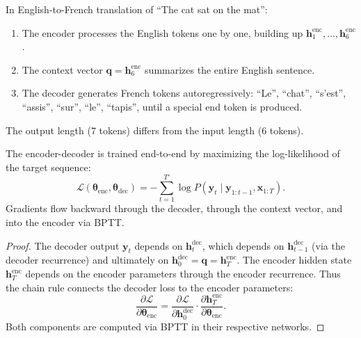 \documentclass[11pt,a4paper]{article}
\begin{document}
\begin{example}
\label{ex:translation}
In English-to-French translation of ``The cat sat on the mat'':
\begin{enumerate}[nosep]
  \item The encoder processes the English tokens one by one,
    building up $\mathbf{h}_1^{\text{enc}}, \ldots,
    \mathbf{h}_6^{\text{enc}}$.
  \item The context vector $\mathbf{q} = \mathbf{h}_6^{\text{enc}}$
    summarizes the entire English sentence.
  \item The decoder generates French tokens autoregressively:
    ``Le'', ``chat'', ``s'est'', ``assis'', ``sur'', ``le'',
    ``tapis'', until a special end token is produced.
\end{enumerate}
The output length (7 tokens) differs from the input length
(6 tokens).
\end{example}

\begin{proposition}
\label{prop:enc-dec-training}
The encoder-decoder is trained end-to-end by maximizing the
log-likelihood of the target sequence:
\begin{equation}
  \mathcal{L}(\boldsymbol{\theta}_{\text{enc}},
    \boldsymbol{\theta}_{\text{dec}})
    = -\sum_{t=1}^{T'} \log P(\mathbf{y}_t \mid
      \mathbf{y}_{1:t-1}, \mathbf{x}_{1:T}).
  \label{eq:enc-dec-loss}
\end{equation}
Gradients flow backward through the decoder, through the context
vector, and into the encoder via BPTT.
\end{proposition}

\begin{proof}
The decoder output $\mathbf{y}_t$ depends on
$\mathbf{h}_t^{\text{dec}}$, which depends on
$\mathbf{h}_{t-1}^{\text{dec}}$ (via the decoder recurrence) and
ultimately on $\mathbf{h}_0^{\text{dec}} = \mathbf{q} =
\mathbf{h}_T^{\text{enc}}$.  The encoder hidden state
$\mathbf{h}_T^{\text{enc}}$ depends on the encoder parameters
through the encoder recurrence.  Thus the chain rule connects the
decoder loss to the encoder parameters:
\[
  \frac{\partial \mathcal{L}}{\partial
    \boldsymbol{\theta}_{\text{enc}}}
    = \frac{\partial \mathcal{L}}
      {\partial \mathbf{h}_0^{\text{dec}}}
    \cdot \frac{\partial \mathbf{h}_T^{\text{enc}}}
      {\partial \boldsymbol{\theta}_{\text{enc}}}.
\]
Both components are computed via BPTT in their respective networks.
\end{proof}
\end{document}
